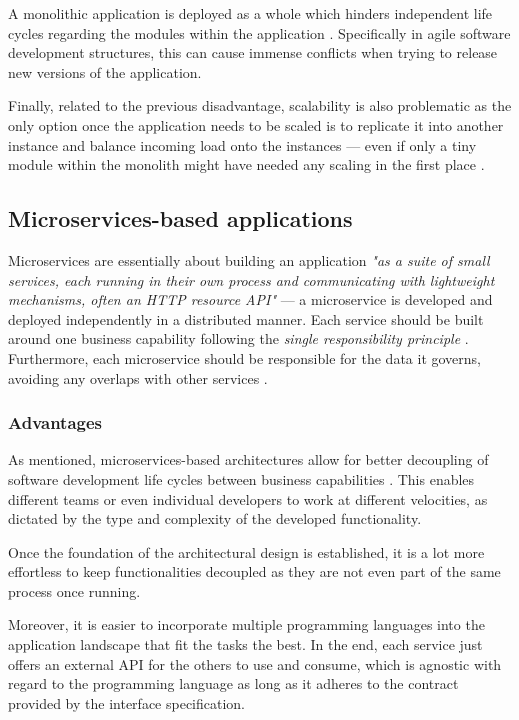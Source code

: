\documentclass[12pt,a4paper]{report}
\begin{document}
A monolithic application is deployed as a whole which hinders
independent life cycles regarding the modules within the application \cite{ms-fowler}.
Specifically in agile software development structures, this can cause
immense conflicts when trying to release new versions of the application.

Finally, related to the previous disadvantage, scalability is also problematic
as the only option once the application needs to be scaled is to replicate it
into another instance and balance incoming load onto the instances --- even if
only a tiny module within the monolith might have needed any scaling in the
first place \cite{ms-fowler, newman2015building}.


\subsection{Microservices\hyp based applications}

Microservices are essentially about building an application \textit{"as a suite
of small services, each running in their own process and communicating with
lightweight mechanisms, often an HTTP resource API"} \cite{ms-fowler} ---
a microservice is developed and deployed independently in a distributed manner.
Each service should be built around one business capability following the
\textit{single responsibility principle} \cite{newman2015building,
martin2003agile}. Furthermore, each microservice should be responsible for the
data it governs, avoiding any overlaps with other services \cite{ms-fowler}.


\subsubsection{Advantages}
As mentioned, microservices\hyp based
architectures allow for better decoupling of software development life cycles
between business capabilities \cite{ms-fowler}. This enables different teams or
even individual developers to work at different velocities,
as dictated by the type and complexity of the developed functionality.

Once the foundation of the architectural design is established,
it is a lot more effortless to keep functionalities decoupled as they are not
even part of the same process once running.

Moreover, it is easier to incorporate multiple programming languages into the
application landscape that fit the tasks the best. In the end, each service
just offers an external API for the others to use and consume, which is
agnostic with regard to the programming language as long as it adheres
to the contract provided by the interface specification.
\end{document}
